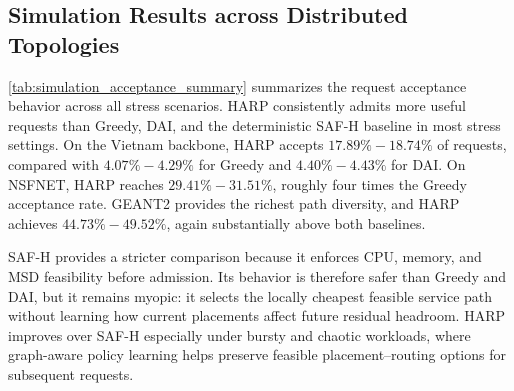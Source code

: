 \documentclass[final,5p]{elsarticle}
\begin{document}
\subsection{Simulation Results across Distributed Topologies}
\label{subsec:simulation_results}

\autoref{tab:simulation_acceptance_summary} summarizes the request acceptance behavior across all stress scenarios. HARP consistently admits more useful requests than Greedy, DAI, and the deterministic SAF-H baseline in most stress settings. On the Vietnam backbone, HARP accepts \(17.89\% - 18.74\%\) of requests, compared with \(4.07\% - 4.29\%\) for Greedy and \(4.40\% - 4.43\%\) for DAI. On NSFNET, HARP reaches \(29.41\% - 31.51\%\), roughly four times the Greedy acceptance rate. GEANT2 provides the richest path diversity, and HARP achieves \(44.73\% - 49.52\%\), again substantially above both baselines.

SAF-H provides a stricter comparison because it enforces CPU, memory, and MSD feasibility before admission. Its behavior is therefore safer than Greedy and DAI, but it remains myopic: it selects the locally cheapest feasible service path without learning how current placements affect future residual headroom. HARP improves over SAF-H especially under bursty and chaotic workloads, where graph-aware policy learning helps preserve feasible placement--routing options for subsequent requests.
\end{document}

